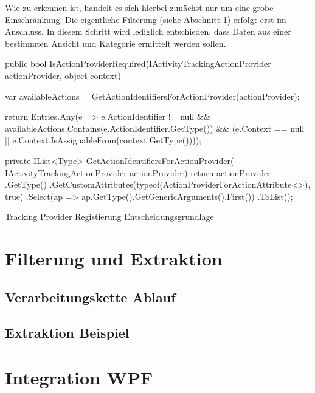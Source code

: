 Wie zu erkennen ist, handelt es sich hierbei zunächst nur um eine grobe Einschränkung. Die eigentliche Filterung (siehe Abschnitt \ref{sec:data_extraction_impl}) erfolgt erst im Anschluss. In diesem Schritt wird lediglich entschieden, dass Daten aus einer bestimmten Ansicht und Kategorie ermittelt werden sollen.

\begin{program}[H]
\begin{CsCode}
public bool IsActionProviderRequired(IActivityTrackingActionProvider actionProvider, 
                                     object context)
{
        var availableActions = GetActionIdentifiersForActionProvider(actionProvider);

        return Entries.Any(e => 
                    e.ActionIdentifier != null && 
                    availableActions.Contains(e.ActionIdentifier.GetType()) &&
                    (e.Context == null || e.Context.IsAssignableFrom(context.GetType())));
}
private IList<Type> GetActionIdentifiersForActionProvider(
                        IActivityTrackingActionProvider actionProvider)
{
        return actionProvider
            .GetType()
            .GetCustomAttributes(typeof(ActionProviderForActionAttribute<>), true)
            .Select(ap => ap.GetType().GetGenericArguments().First())
            .ToList();
}
\end{CsCode}
\caption{Tracking Provider Registierung Entscheidungsgrundlage}
\label{prog:registration_code_snipped}
\end{program}


\section{Filterung und Extraktion}
\label{sec:data_extraction_impl}


\subsection{Verarbeitungskette Ablauf}

\subsection{Extraktion Beispiel}

\section{Integration WPF}
\label{sec:integration_wpf_impl}


